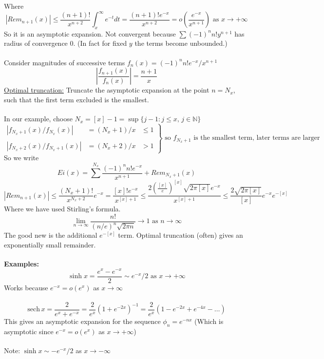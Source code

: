 \documentclass{article}
\newcommand{\examples}{\textbf{Examples:}}
\begin{document}
Where
\[ |Rem_{n+1}(x)| \leq \frac{(n+1)!}{x^{n+2}} \int_x^{\infty} e^{-t} dt =
\frac{(n+1)! e^{-x}}{x^{n+2}} = o\left( \frac{e^{-x}}{x^{n+1}} \right) 
\mbox{ as } x \to + \infty \]
So it is an asymptotic expansion. Not convergent because $\sum (-1)^n n! y^{n+1}$
has radius of convergence 0. (In fact for fixed $y$ the terms become unbounded.)
\\
\\
Consider magnitudes of successive terms $f_n(x) = (-1)^n n! e^{-x}/x^{n+1}$
\[ \left| \frac{f_{n+1}(x)}{f_n(x)}\right| = \frac{n+1}{x} \]
\underline{Optimal truncation:} Truncate the asymptotic expansion at the 
point $n=N_x$, such that the first term excluded is the smallest.
\\
\\
In our example, choose $N_x = [x] -1 = \sup \{j-1: j \leq x, \, j\in \mathbb{N} \}$
\[ \left. \begin{array}{ccc}
\left| f_{N_x+1}(x)/f_{N_x}(x)\right| &= (N_x+1)/x &\leq 1 \\
\\
\left| f_{N_x+2}(x)/f_{N_x+1}(x)\right| &= (N_x+2)/x &> 1 \end{array}
\right\} \mbox{ so } f_{N_x+1} \mbox{ is the smallest term, later terms are larger} \]
So we write
\[ Ei(x) = \sum^{N_x} \frac{(-1)^n n! e^{-x}}{x^{n+1}} + Rem_{N_x+1}(x) \]
\[ |Rem_{n+1}(x)| \leq \frac{(N_x+1)!}{x^{N_x+2}}e^{-x} =
\frac{[x]! e^{-x}}{x^{[x]+1}} \leq
\frac{2 \left( \frac{[x]}{e} \right)^{[x]} \sqrt{2\pi [x]} e^{-x}}{x^{[x]+1}}
\leq \frac{2\sqrt{2\pi[x]}}{[x]} e^{-x} e^{-[x]} \]
Where we have used Stirling's formula. 
\[ \lim_{n \to \infty} \frac{n!}{(n/e)^n \sqrt{2\pi n}} \to 1 \mbox{ as } n \to \infty \]
The good new is the additional 
$e^{-[x]}$ term. Optimal truncation (often) gives an exponentially small 
remainder.
\\
\\
\examples\
\[ \sinh x = \frac{e^x - e^{-x}}{2} \sim e^{-x}/2 \mbox{ as } x \to + \infty \]
Works because $e^{-x} = o(e^x)$ as $x \to \infty$
\\
\\
\[ \mathrm{sech}  \, x = \frac{2}{e^x + e^{-x}} = \frac{2}{e^x}(1 + e^{-2x})^{-1} =
\frac{2}{e^x}(1 - e^{-2x} + e^{-4x} - \dots) \]
This gives an asymptotic expansion for the sequence $\phi_n = e^{-nx}$
(Which is asymptotic since $e^{-x} = o(e^x)$ as $x \to + \infty$)
\\
\\
Note: $\sinh x \sim -e^{-x}/2$ as $x \to -\infty$
\\
\end{document}
